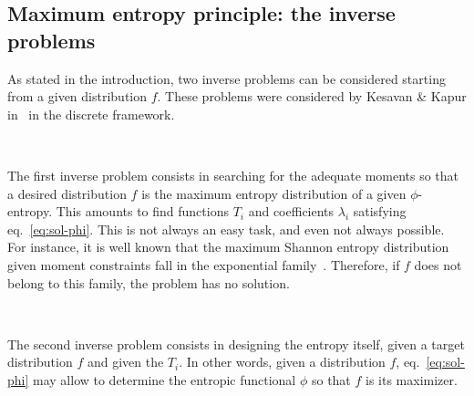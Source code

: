 \documentclass[entropy,article,submit,moreauthors,pdftex]{Definitions/mdpi}
\begin{document}
\subsection{Maximum entropy principle: the inverse problems}
\label{subsec:MaxPhiEntInverse}

As stated in  the introduction, two inverse problems can  be considered starting
from a  given distribution  $f$. These  problems were  considered by  Kesavan \&
Kapur in~\cite{KesKap89} in the discrete framework.

\

The first inverse problem consists in searching for the adequate moments so that
a  desired distribution  $f$  is the  maximum entropy  distribution  of a  given
$\phi$-entropy.   This   amounts  to  find  functions   $T_i$  and  coefficients
$\lambda_i$ satisfying eq.~\eqref{eq:sol-phi}.  This is not always an easy task,
and even not  always possible. For instance,  it is well known  that the maximum
Shannon entropy  distribution given moment  constraints fall in  the exponential
family~\cite{CovTho06, BorLew91:05, Arn01, MezMon09}. Therefore, if $f$ does not
belong to this family, the problem has no solution.


\

The second  inverse problem consists  in designing  the entropy itself,  given a
target  distribution  $f$  and  given  the  $T_i$.   In  other  words,  given  a
distribution  $f$, eq.~\eqref{eq:sol-phi}  may allow  to determine  the entropic
functional $\phi$ so that $f$ is its maximizer.
\end{document}

